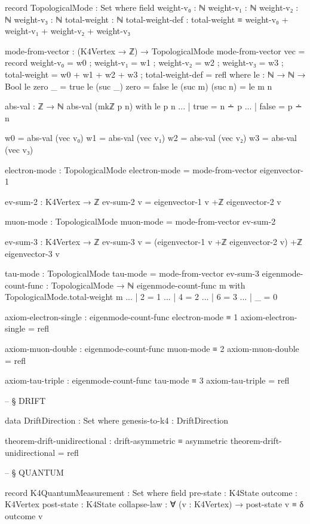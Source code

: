 \documentclass[11pt,a4paper]{book}
\begin{document}
\begin{code}
record TopologicalMode : Set where
  field
    weight-v₀ : ℕ
    weight-v₁ : ℕ
    weight-v₂ : ℕ
    weight-v₃ : ℕ
    total-weight : ℕ
    total-weight-def : total-weight ≡ 
      weight-v₀ + weight-v₁ + weight-v₂ + weight-v₃

mode-from-vector : (K4Vertex → ℤ) → TopologicalMode
mode-from-vector vec = 
  record
    { weight-v₀ = w0
    ; weight-v₁ = w1
    ; weight-v₂ = w2
    ; weight-v₃ = w3
    ; total-weight = w0 + w1 + w2 + w3
    ; total-weight-def = refl
    }
  where
    le : ℕ → ℕ → Bool
    le zero _ = true
    le (suc _) zero = false
    le (suc m) (suc n) = le m n

    abs-val : ℤ → ℕ
    abs-val (mkℤ p n) with le p n
    ... | true  = n ∸ p
    ... | false = p ∸ n

    w0 = abs-val (vec v₀)
    w1 = abs-val (vec v₁)
    w2 = abs-val (vec v₂)
    w3 = abs-val (vec v₃)

electron-mode : TopologicalMode
electron-mode = mode-from-vector eigenvector-1

ev-sum-2 : K4Vertex → ℤ
ev-sum-2 v = eigenvector-1 v +ℤ eigenvector-2 v

muon-mode : TopologicalMode
muon-mode = mode-from-vector ev-sum-2

ev-sum-3 : K4Vertex → ℤ
ev-sum-3 v = (eigenvector-1 v +ℤ eigenvector-2 v) +ℤ eigenvector-3 v

tau-mode : TopologicalMode
tau-mode = mode-from-vector ev-sum-3
eigenmode-count-func : TopologicalMode → ℕ
eigenmode-count-func m with TopologicalMode.total-weight m
... | 2 = 1
... | 4 = 2
... | 6 = 3
... | _ = 0

axiom-electron-single : eigenmode-count-func electron-mode ≡ 1
axiom-electron-single = refl

axiom-muon-double : eigenmode-count-func muon-mode ≡ 2
axiom-muon-double = refl

axiom-tau-triple : eigenmode-count-func tau-mode ≡ 3
axiom-tau-triple = refl


-- § DRIFT

data DriftDirection : Set where
  genesis-to-k4 : DriftDirection

theorem-drift-unidirectional : drift-asymmetric ≡ asymmetric
theorem-drift-unidirectional = refl


-- § QUANTUM

record K4QuantumMeasurement : Set where
  field
    pre-state     : K4State
    outcome       : K4Vertex
    post-state    : K4State
    collapse-law  : ∀ (v : K4Vertex) → post-state v ≡ δ outcome v


\end{code}
\end{document}
